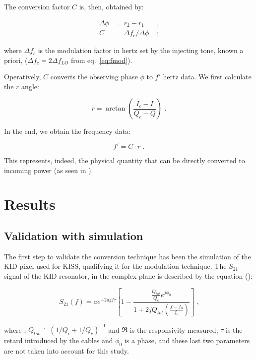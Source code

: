 \documentclass[twocolumn,traditabstract]{aa}\\
\begin{document}
\noindent The conversion factor $C$ is, then, obtained by:

\begin{equation}
\begin{align}
\Delta \phi &= r_2-r_1 &\text{ ,}\\
C&=\Delta f_c/\Delta\phi &\text{ ;}
\end{align}
\end{equation}

\noindent where $\Delta f_c$ is the modulation factor in hertz set by the injecting tone, known a priori, ($\Delta f_c = 2\Delta f_{LO}$ from eq.~\ref{eq:fmod}).

Operatively, $C$ converts the observing phase $\phi$ to $f'$ hertz data. We first calculate the $r$ angle:


\begin{equation}
r = \arctan \left( \frac{I_c - I}{Q_c - Q} \right) \text{ .}
\end{equation}

\noindent In the end, we obtain the frequency data:

\begin{equation}
f' = C \cdot r \text{ .}
\end{equation}

\noindent This represents, indeed, the physical quantity that can be directly converted to incoming power (as seen in \cite{Swenson}).


\section{Results}
\label{sec:results}

\subsection{Validation with simulation}

The first step to validate the conversion technique has been the simulation of the KID pixel used for KISS, qualifying it for the modulation technique.
The $S_{21}$ signal of the KID resonator, in the complex plane is described by the equation (\cite{Gao}):

\begin{equation}
S_{21}(f)=ae^{-2\pi j f \tau} \left[ 1-\frac{\frac{Q_{tot}}{Q_c}e^{j\phi_0}}{1+2jQ_{tot}\left(\frac{f-f_0}{f_0}\right)}\right] \text{ ,}
\label{eq:s21_IQ}
\end{equation}

\noindent where , $Q_{tot}\doteq\left( 1/Q_i + 1/Q_c \right)^{-1}$ and $\mathfrak{R}$ is the responsivity measured; $\tau$ is the retard introduced by the cables and $\phi_0$ is a phase, and these last two parameters are not taken into account for this study.
\end{document}
